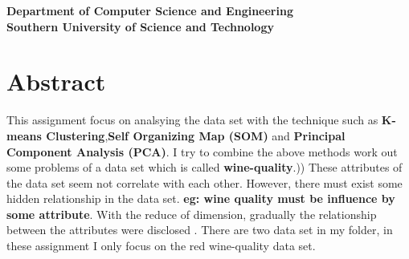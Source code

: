 \documentclass[titlepage,a4paper,12pt,thmsb]{report}
\begin{document}
\begin{titlepage}
\begin{center}
\vskip 0.5cm

\large{\bf Department of Computer Science and Engineering} \\
\vskip 0.5cm
\Large{\bf Southern University of Science and Technology}\\
\vskip 0.5cm
{\centering {}}
\end{center}
\pagebreak
\end{titlepage}


\chapter*{Abstract}
This assignment focus on analsying the data set with the technique such as {\bf K-means Clustering},{\bf Self Organizing Map (SOM)} and {\bf Principal Component Analysis (PCA)}. I try to combine the above methods work out some problems of a data set which is called {\bf wine-quality}.))
These attributes of the data set seem not correlate with each other. However, there must exist some hidden relationship in the data set. {\bf eg: wine quality must be influence by some attribute}. With the reduce of dimension, gradually the relationship between the attributes were disclosed .  There are two data set in my folder, in these assignment I only focus on the red wine-quality data set.
\end{document}
